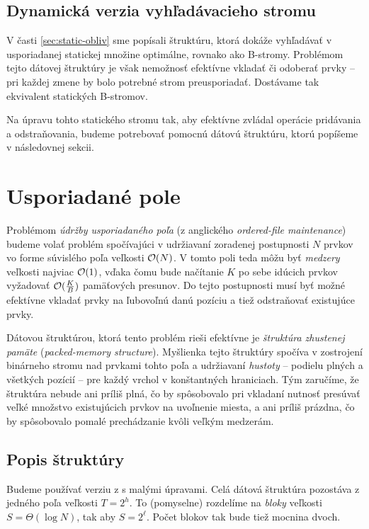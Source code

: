 \subsection{Dynamická verzia vyhľadávacieho stromu} 
V časti \ref{sec:static-obliv} sme popísali štruktúru, ktorá dokáže vyhľadávať v usporiadanej statickej množine optimálne, rovnako ako \aware B-stromy. Problémom tejto dátovej štruktúry je však nemožnosť efektívne vkladať či odoberať prvky -- pri každej zmene by bolo potrebné strom preusporiadať. Dostávame tak \obliv ekvivalent statických \aware B-stromov. 

Na úpravu tohto statického stromu tak, aby efektívne zvládal operácie pridávania a odstraňovania, budeme potrebovať pomocnú dátovú štruktúru, ktorú popíšeme v následovnej sekcii.

\section{Usporiadané pole} \label{sec:orderedfile}

Problémom \emph{údržby usporiadaného poľa} (z anglického \emph{ordered-file maintenance}) budeme volať problém spočívajúci v udržiavaní zoradenej postupnosti $N$ prvkov vo forme súvislého poľa veľkosti $\mathcal{O}(N)$. V tomto poli teda môžu byť \emph{medzery} veľkosti najviac $\mathcal{O}(1)$, vďaka čomu bude načítanie $K$ po sebe idúcich prvkov vyžadovať $\mathcal{O}(\frac{K}{B})$ pamäťových presunov. Do tejto postupnosti musí byť možné efektívne vkladať prvky na ľubovoľnú danú pozíciu a tiež odstraňovať existujúce prvky.

Dátovou štruktúrou, ktorá tento problém rieši efektívne je \emph{štruktúra zhustenej pamäte} (\emph{packed-memory structure}). Myšlienka tejto štruktúry spočíva v zostrojení binárneho stromu nad prvkami tohto poľa a  udržiavaní \emph{hustoty} -- podielu plných a všetkých pozícií -- pre každý vrchol v konštantných hraniciach. Tým zaručíme, že štruktúra nebude ani príliš plná, čo by spôsobovalo pri vkladaní nutnosť presúvať veľké množstvo existujúcich prvkov na uvoľnenie miesta, a ani príliš prázdna, čo by spôsobovalo pomalé prechádzanie kvôli veľkým medzerám.

\subsection{Popis štruktúry} \label{sec:of-desc}

Budeme používať verziu z \citep{btreeshort} s malými úpravami. Celá dátová štruktúra pozostáva z jedného poľa veľkosti $T = 2^h$. To (pomyselne) rozdelíme na \emph{bloky} veľkosti $S=\Theta(\log{N})$, tak aby $S = 2^\ell$. Počet blokov tak bude tiež mocnina dvoch.

